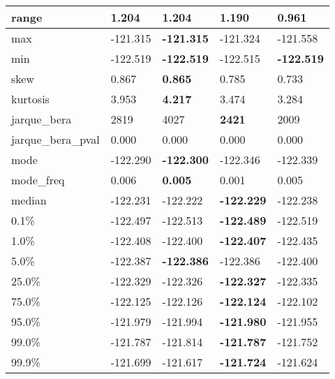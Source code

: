 \begin{table}[H]
\begin{tabular}{|l|m{10em}|m{10em}|m{10em}|m{10em}|}
\hline range & 1.204 & \bfseries 1.204 & 1.190 & \cellcolor[rgb]{0.9, 0.54, 0.52} 0.961 \\
\hline max & -121.315 & \bfseries -121.315 & -121.324 & \cellcolor[rgb]{0.9, 0.54, 0.52} -121.558 \\
\hline min & -122.519 & \bfseries -122.519 & \cellcolor[rgb]{0.9, 0.54, 0.52} -122.515 & \bfseries -122.519 \\
\hline skew & 0.867 & \bfseries 0.865 & 0.785 & \cellcolor[rgb]{0.9, 0.54, 0.52} 0.733 \\
\hline kurtosis & 3.953 & \bfseries 4.217 & 3.474 & \cellcolor[rgb]{0.9, 0.54, 0.52} 3.284 \\
\hline jarque\_bera & 2819 & \cellcolor[rgb]{0.9, 0.54, 0.52} 4027 & \bfseries 2421 & 2009 \\
\hline jarque\_bera\_pval & 0.000 & 0.000 & 0.000 & 0.000 \\
\hline mode & -122.290 & \bfseries -122.300 & \cellcolor[rgb]{0.9, 0.54, 0.52} -122.346 & -122.339 \\
\hline mode\_freq & 0.006 & \bfseries 0.005 & \cellcolor[rgb]{0.9, 0.54, 0.52} 0.001 & 0.005 \\
\hline median & -122.231 & \cellcolor[rgb]{0.9, 0.54, 0.52} -122.222 & \bfseries -122.229 & -122.238 \\
\hline 0.1\% & -122.497 & -122.513 & \bfseries -122.489 & \cellcolor[rgb]{0.9, 0.54, 0.52} -122.519 \\
\hline 1.0\% & -122.408 & -122.400 & \bfseries -122.407 & \cellcolor[rgb]{0.9, 0.54, 0.52} -122.435 \\
\hline 5.0\% & -122.387 & \bfseries -122.386 & -122.386 & \cellcolor[rgb]{0.9, 0.54, 0.52} -122.400 \\
\hline 25.0\% & -122.329 & -122.326 & \bfseries -122.327 & \cellcolor[rgb]{0.9, 0.54, 0.52} -122.335 \\
\hline 75.0\% & -122.125 & -122.126 & \bfseries -122.124 & \cellcolor[rgb]{0.9, 0.54, 0.52} -122.102 \\
\hline 95.0\% & -121.979 & -121.994 & \bfseries -121.980 & \cellcolor[rgb]{0.9, 0.54, 0.52} -121.955 \\
\hline 99.0\% & -121.787 & -121.814 & \bfseries -121.787 & \cellcolor[rgb]{0.9, 0.54, 0.52} -121.752 \\
\hline 99.9\% & -121.699 & \cellcolor[rgb]{0.9, 0.54, 0.52} -121.617 & \bfseries -121.724 & -121.624 \\
\hline
\end{tabular}
\end{table}
